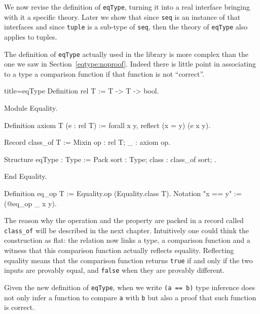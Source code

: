 We now revise the definition of \lstinline/eqType/, turning it into a
real interface bringing with it a specific theory.  Later we show that
since \lstinline/seq/ is an instance of that interfaces and since
\lstinline/tuple/ is a sub-type of \lstinline/seq/, then the theory
of \lstinline/eqType/ also applies to tuples.


The definition of \lstinline/eqType/ actually used in the \mcbMC{}
library is more complex than the one we saw in
Section~\ref{eqtype:noproof}.  Indeed there is little point in
associating to a type a comparison function if that function is
not ``correct''.

\begin{coq}{title=eqType}
Definition rel T := T -> T -> bool.

Module Equality.

Definition axiom T (e : rel T) := forall x y, reflect (x = y) (e x y).

Record class_of T := Mixin {op : rel T; _ : axiom op}.

Structure eqType : Type := Pack {
  sort : Type;
  class : class_of sort;
}.

End Equality.

Definition eq_op T := Equality.op (Equality.class T).
Notation "x == y" := (@eq_op _ x y).
\end{coq}

The reason why the operation and the property are packed in
a record called \lstinline/class_of/ will be described in the next
chapter.
Intuitively one could think the construction as flat:
the relation now links a type, a comparison function and a
witness that this comparison function actually reflects equality.
Reflecting equality means that the comparison function returns
\lstinline/true/ if and only if the two inputs are provably equal, and
\lstinline/false/ when they are provably different.


Given the new definition of \lstinline/eqType/,
when we write \lstinline/(a == b)/ type inference does not only infer
a function to compare \lstinline/a/ with \lstinline/b/ but also a
proof that such function is correct.

